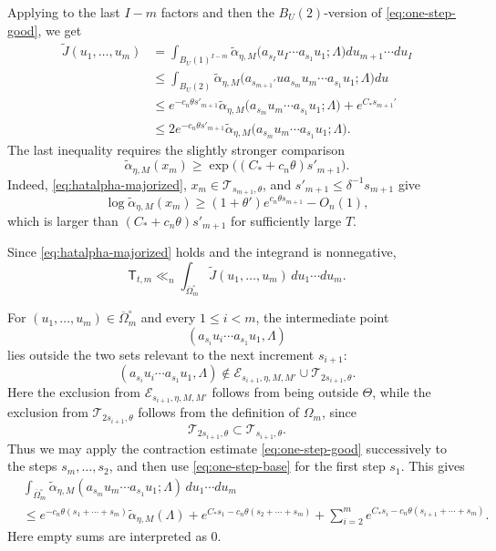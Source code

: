 \documentclass[reqno,11pt]{amsart}
\numberwithin{equation}{section}
\theoremstyle{definition}
\theoremstyle{remark}
\begin{document}
    Applying  to the last $I-m$ factors and
    then the $B_U(2)$-version of \eqref{eq:one-step-good}, we get
    \begin{equation}\label{eq:Jtildeiterationupperbound}{\begin{aligned}
        \widetilde{J}(u_1,\ldots,u_m)&=\int_{B_{U}(1)^{I-m}}\widetilde{\alpha}_{\eta,M}\big(a_{s_I}u_I\cdots a_{s_1}u_1;\Lambda\big)du_{m+1}\cdots du_I\\&\le \int_{B_U(2)} \widetilde{\alpha}_{\eta,M}\big(a_{s_{m+1}'}ua_{s_m}u_{m}\cdots a_{s_1}u_1;\Lambda\big)du\\&\leq e^{-c_n\theta s'_{m+1}}\widetilde{\alpha}_{\eta,M}\big(a_{s_m}u_m\cdots a_{s_1}u_1;\Lambda\big)+e^{C_*s_{m+1}'}\\&\leq 2e^{-c_n\theta s'_{m+1}}\widetilde{\alpha}_{\eta,M}\big(a_{s_m}u_m\cdots a_{s_1}u_1;\Lambda\big).
    \end{aligned}}\end{equation}
The last inequality requires the slightly stronger comparison
$$
\widetilde\alpha_{\eta,M}(x_m)
\ge
\exp\bigl((C_*+c_n\theta)s'_{m+1}\bigr).
$$
Indeed, \eqref{eq:hatalpha-majorized},
$x_m\in\mathcal T_{s_{m+1},\theta}$, and
$s'_{m+1}\le\delta^{-1}s_{m+1}$ give
$$
\log\widetilde\alpha_{\eta,M}(x_m)
\ge
(1+\theta')e^{c_n\theta s_{m+1}}-O_n(1),
$$
which is larger than
$(C_*+c_n\theta)s'_{m+1}$ for  sufficiently large $T$.

Since \eqref{eq:hatalpha-majorized} holds and the integrand is
nonnegative,
$$
\mathsf T_{t,m}
\ll_n
\int_{\overline\Omega_m^{\circ}}
\widetilde J(u_1,\ldots,u_m)\,du_1\cdots du_m.
$$

For $(u_1,\ldots,u_m)\in\overline\Omega_m^{\circ}$ and every
$1\le i<m$, the intermediate point
$$
(a_{s_i}u_i\cdots a_{s_1}u_1,\Lambda)
$$
lies outside the two sets relevant to the next increment $s_{i+1}$:
$$
(a_{s_i}u_i\cdots a_{s_1}u_1,\Lambda)
\notin
\mathcal E_{s_{i+1},\eta,M,M'}
\cup
\mathcal T_{2s_{i+1},\theta}.
$$
Here the exclusion from $\mathcal E_{s_{i+1},\eta,M,M'}$ follows
from being outside $\Theta$, while the exclusion from
$\mathcal T_{2s_{i+1},\theta}$ follows from the definition of
$\Omega_m$, since
$$
\mathcal T_{2s_{i+1},\theta}
\subset
\mathcal T_{s_{i+1},\theta}.
$$
Thus we may apply the contraction estimate \eqref{eq:one-step-good}
successively to the steps $s_m,\dots,s_2$, and then use
\eqref{eq:one-step-base} for the first step $s_1$. This gives
\begin{equation}\label{eq:Goodestimate0}
\begin{aligned}
&\int_{\overline\Omega_m^{\circ}}
\widetilde{\alpha}_{\eta,M}
(a_{s_m}u_m\cdots a_{s_1}u_1;\Lambda)
\,du_1\cdots du_m                                      \\
& \le
e^{-c_n\theta(s_1+\cdots+s_m)}
\widetilde{\alpha}_{\eta,M}(\Lambda)                  +
e^{C_*s_1
-c_n\theta(s_2+\cdots+s_m)}     +
\sum_{i=2}^m
e^{C_*s_i
-c_n\theta(s_{i+1}+\cdots+s_m)}.
\end{aligned}
\end{equation}
Here empty sums are interpreted as $0$.
\end{document}
